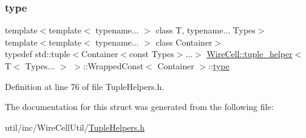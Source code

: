 \subsubsection{\texorpdfstring{type}{type}}
{\footnotesize\ttfamily template$<$template$<$ typename... $>$ class T, typename... Types$>$ \\
template$<$template$<$ typename... $>$ class Container$>$ \\
typedef std\+::tuple$<$Container$<$const Types$>$...$>$ \hyperlink{struct_wire_cell_1_1tuple__helper}{Wire\+Cell\+::tuple\+\_\+helper}$<$ T$<$ Types... $>$ $>$\+::Wrapped\+Const$<$ Container $>$\+::\hyperlink{struct_wire_cell_1_1tuple__helper_3_01_t_3_01_types_8_8_8_01_4_01_4_1_1_wrapped_const_a6ddd5e1e18a972eafd2282972d5ca1a2}{type}}



Definition at line 76 of file Tuple\+Helpers.\+h.



The documentation for this struct was generated from the following file\+:\begin{DoxyCompactItemize}
\item 
util/inc/\+Wire\+Cell\+Util/\hyperlink{_tuple_helpers_8h}{Tuple\+Helpers.\+h}\end{DoxyCompactItemize}
